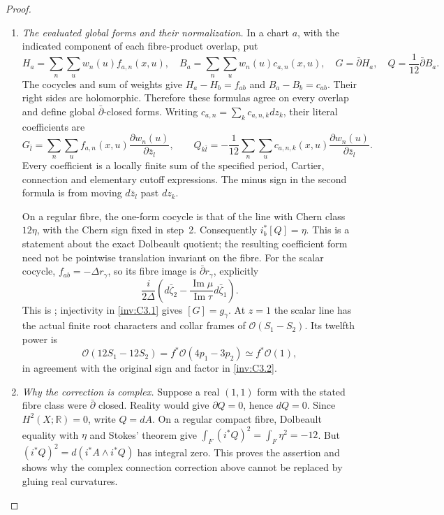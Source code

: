 \begin{proof}
\begin{enumerate}[label=\arabic*.,leftmargin=*]
\item \emph{The evaluated global forms and their normalization.}
In a chart $a$, with the indicated component of each fibre-product
overlap, put
\begin{equation}\label{inv:eq:atlas-final-forms}
 H_a=\sum_n\sum_u w_n(u)f_{a,n}(x,u),\quad
 B_a=\sum_n\sum_u w_n(u)c_{a,n}(x,u),\quad
 G=\bar\partial H_a,\quad Q=\frac1{12}\bar\partial B_a.
\end{equation}
The cocycles and sum of weights give
$H_a-H_b=f_{ab}$ and $B_a-B_b=c_{ab}$.
Their right sides are holomorphic.  Therefore these formulas agree
on every overlap and define global $\bar\partial$-closed forms.
Writing $c_{a,n}=\sum_kc_{a,n,k}dz_k$, their literal coefficients are
\begin{equation}\label{inv:eq:atlas-final-coefficients}
 G_{\bar l}=\sum_n\sum_u f_{a,n}(x,u)
                       \frac{\partial w_n(u)}{\partial\bar z_l},
 \qquad
 Q_{k\bar l}=-\frac1{12}\sum_n\sum_u c_{a,n,k}(x,u)
                       \frac{\partial w_n(u)}{\partial\bar z_l}.
\end{equation}
Every coefficient is a locally finite sum of the specified period,
Cartier, connection and elementary cutoff expressions.  The minus
sign in the second formula is from moving $d\bar z_l$ past $dz_k$.

On a regular fibre, the one-form cocycle is that of the line with
Chern class $12\eta$, with the Chern sign fixed in step~2.
Consequently $i_b^*[Q]=\eta$.  This is a statement about the exact
Dolbeault quotient; the resulting coefficient form need not be
pointwise translation invariant on the fibre.
For the scalar cocycle, $f_{ab}=-\Delta r_\gamma$, so its fibre
image is $\bar\partial r_\gamma$, explicitly
\[
 \frac{i}{2\Delta}
 \left(d\bar\zeta_2-\frac{\operatorname{Im}\mu}{\operatorname{Im}\tau}
                      d\bar\zeta_1\right).
\]
This is ; injectivity in
\cref{inv:C3.1} gives $[G]=g_\gamma$.
At $z=1$ the scalar line has the actual finite root characters and
collar frames of $\mathcal O(S_1-S_2)$.  Its twelfth power is
\[
 \mathcal O(12S_1-12S_2)
 =f^*\mathcal O(4p_1-3p_2)\simeq f^*\mathcal O(1),
\]
in agreement with the original sign and factor in \cref{inv:C3.2}.

\item \emph{Why the correction is complex.}
Suppose a real $(1,1)$ form with the stated fibre class were
$\bar\partial$ closed.  Reality would give $\partial Q=0$, hence
$dQ=0$.  Since $H^2(X;\mathbb R)=0$, write $Q=dA$.
On a regular compact fibre, Dolbeault equality with $\eta$ and
Stokes' theorem give $\int_F(i^*Q)^2=\int_F\eta^2=-12$.
But $(i^*Q)^2=d(i^*A\wedge i^*Q)$ has integral zero.
This proves the assertion and shows why the complex connection
correction above cannot be replaced by gluing real curvatures.
\end{enumerate}
\end{proof}
